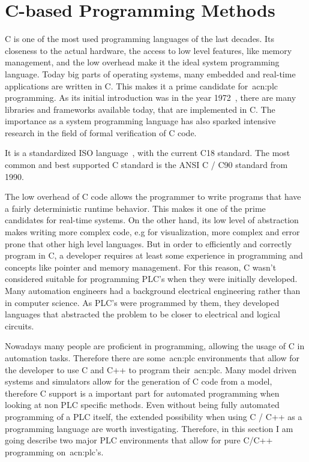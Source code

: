 \section{C-based Programming Methods}
\label{sec:c_methods}

C is one of the most used programming languages of the last decades.
Its closeness to the actual hardware, the access to low level features, like memory management, and the low overhead make it the ideal system programming language.
Today big parts of operating systems, many embedded and real-time applications are written in C.
This makes it a prime candidate for~\acrshort{acn:plc} programming.
As its initial introduction was in the year 1972~\cite{10.5555/576122}, there are many libraries and frameworks available today, that are implemented in C.
The importance as a system programming language has also sparked intensive research in the field of formal verification of C code.

It is a standardized ISO language~\cite{ISO:9899:2018}, with the current C18 standard.
The most common and best supported C standard is the ANSI C / C90 standard from 1990.

The low overhead of C code allows the programmer to write programs that have a fairly deterministic runtime behavior.
This makes it one of the prime candidates for real-time systems.
On the other hand, its low level of abstraction makes writing more complex code, e.g for visualization, more complex and error prone that other high level languages.
But in order to efficiently and correctly program in C, a developer requires at least some experience in programming and concepts like pointer and memory management.
For this reason, C wasn't considered suitable for programming PLC's when they were initially developed.
Many automation engineers had a background electrical engineering rather than in computer science.
As PLC's were programmed by them, they developed languages that abstracted the problem to be closer to electrical and logical circuits.

Nowadays many people are proficient in programming, allowing the usage of C in automation tasks.
Therefore there are some~\acrshort{acn:plc} environments that allow for the developer to use C and C++ to program their~\acrshort{acn:plc}.
Many model driven systems and simulators allow for the generation of C code from a model, therefore C support is a important part for automated programming when looking at non PLC specific methods.
Even without being fully automated programming of a PLC itself, the extended possibility when using C / C++ as a programming language are worth investigating.
Therefore, in this section I am going describe two major PLC environments that allow for pure C/C++ programming on~\acrshort{acn:plc}'s.

